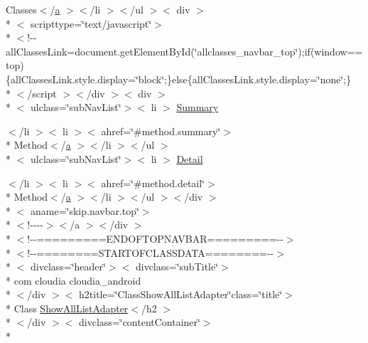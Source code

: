 \begin{DoxyCompactItemize}
\item 
Classes$<$/\hyperlink{style_8css_a5e8981582017bb8b84c21f148345d1f7}{a} $>$$<$/li $>$$<$/ul $>$$<$ div $>$\\*
$<$ scripttype=\char`\"{}text/javascript\char`\"{}$>$\\*
$<$!-\/-\/all\-Classes\-Link=document.\-get\-Element\-By\-Id(\char`\"{}allclasses\-\_\-navbar\-\_\-top\char`\"{});if(window==top)\{all\-Classes\-Link.\-style.\-display=\char`\"{}block\char`\"{};\}else\{all\-Classes\-Link.\-style.\-display=\char`\"{}none\char`\"{};\}\\*
$<$/script $>$$<$/div $>$$<$ div $>$\\*
$<$ ulclass=\char`\"{}sub\-Nav\-List\char`\"{}$>$$<$ li $>$ \hyperlink{_show_all_list_adapter_8html_a6f9ab45abc9b0679dc1b132fbacfc681}{Summary}
\item 
$<$/li $>$$<$ li $>$$<$ ahref=\char`\"{}\#method.\-summary\char`\"{}$>$\\*
 Method$<$/\hyperlink{style_8css_a5e8981582017bb8b84c21f148345d1f7}{a} $>$$<$/li $>$$<$/ul $>$\\*
$<$ ulclass=\char`\"{}sub\-Nav\-List\char`\"{}$>$$<$ li $>$ \hyperlink{_show_all_list_adapter_8html_a1e04b5ec07bcd5281e26dcd40e5b3a94}{Detail}
\item 
$<$/li $>$$<$ li $>$$<$ ahref=\char`\"{}\#method.\-detail\char`\"{}$>$\\*
 Method$<$/\hyperlink{style_8css_a5e8981582017bb8b84c21f148345d1f7}{a} $>$$<$/li $>$$<$/ul $>$$<$/div $>$\\*
$<$ aname=\char`\"{}skip.\-navbar.\-top\char`\"{}$>$\\*
$<$!-\/-\/-\/-\/$>$$<$/a $>$$<$/div $>$\\*
$<$!-\/-\/=========E\-N\-D\-O\-F\-T\-O\-P\-N\-A\-V\-B\-A\-R=========-\/-\/$>$\\*
$<$!-\/-\/========S\-T\-A\-R\-T\-O\-F\-C\-L\-A\-S\-S\-D\-A\-T\-A========-\/-\/$>$\\*
$<$ divclass=\char`\"{}header\char`\"{}$>$$<$ divclass=\char`\"{}sub\-Title\char`\"{}$>$\\*
 com cloudia cloudia\-\_\-android\\*
$<$/div $>$$<$ h2title=\char`\"{}Class\-Show\-All\-List\-Adapter\char`\"{}class=\char`\"{}title\char`\"{}$>$\\*
 Class \hyperlink{index-17_8html_ac4c9b292aa5c493809be1c20369d4398}{Show\-All\-List\-Adapter}$<$/h2 $>$\\*
$<$/div $>$$<$ divclass=\char`\"{}content\-Container\char`\"{}$>$\\*
$$
\end{DoxyCompactItemize}
